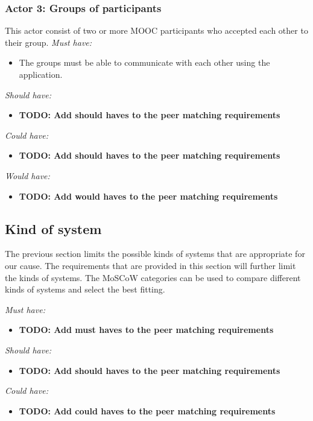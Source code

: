 \documentclass[]{article}
\newcommand{\TODO}[1]{{\color{red}\textbf{TODO: #1}}}
\begin{document}
\subsubsection{Actor 3: Groups of participants}
This actor consist of two or more MOOC participants who accepted each other to their group.
\emph{Must have:}
\begin{itemize}
\item The groups must be able to communicate with each other using the application.
\end{itemize}

\emph{Should have:}
\begin{itemize}
\item \TODO{Add should haves to the peer matching requirements}
\end{itemize}

\emph{Could have:}
\begin{itemize}
\item \TODO{Add should haves to the peer matching requirements}
\end{itemize}

\emph{Would have:}
\begin{itemize}
\item \TODO{Add would haves to the peer matching requirements}
\end{itemize}

\subsection{Kind of system}
The previous section limits the possible kinds of systems that are appropriate for our cause.
The requirements that are provided in this section will further limit the kinds of systems.
The MoSCoW categories can be used to compare different kinds of systems and select the best fitting.

\emph{Must have:}
\begin{itemize}
\item \TODO{Add must haves to the peer matching requirements}
\end{itemize}

\emph{Should have:}
\begin{itemize}
\item \TODO{Add should haves to the peer matching requirements}
\end{itemize}

\emph{Could have:}
\begin{itemize}
\item \TODO{Add could haves to the peer matching requirements}
\end{itemize}
\end{document}
